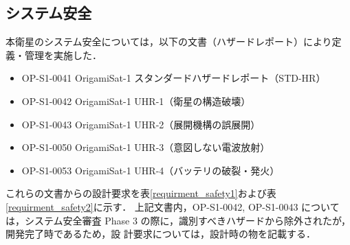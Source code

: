 \subsection{システム安全}
本衛星のシステム安全については，以下の文書（ハザードレポート）により定
義・管理を実施した．
\begin{itemize}
  \item OP-S1-0041 OrigamiSat-1 スタンダードハザードレポート（STD-HR）
  \item OP-S1-0042 OrigamiSat-1 UHR-1（衛星の構造破壊）
  \item OP-S1-0043 OrigamiSat-1 UHR-2（展開機構の誤展開）
  \item OP-S1-0050 OrigamiSat-1 UHR-3（意図しない電波放射）
  \item OP-S1-0053 OrigamiSat-1 UHR-4（バッテリの破裂・発火）
\end{itemize}
これらの文書からの設計要求を表\ref{requirment_safety1}および表\ref{requirment_safety2}に示す．
上記文書内，OP-S1-0042, OP-S1-0043 については，システム安全審査 Phase
3 の際に，識別すべきハザードから除外されたが，開発完了時であるため，設
計要求については，設計時の物を記載する．

